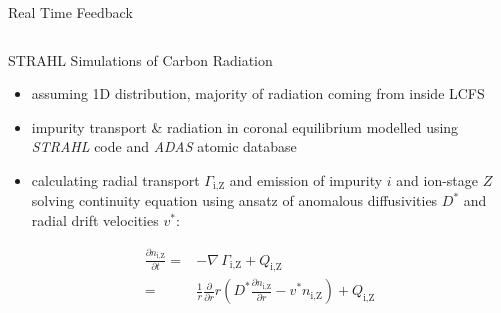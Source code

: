 \documentclass[final]{beamer}
\newcommand{\ix}[1]{_\text{#1}}
\newcommand{\fett}[1]{\textbf{#1}}
\newcommand{\tilt}[1]{\textit{#1}}
\begin{document}
\begin{frame}
\begin{minipage}[t]{0.6\textwidth}
\begin{kasten}{Real Time Feedback}
\begin{columns}
\begin{kasten4}{%
                        STRAHL Simulations of Carbon Radiation}
                        \flushleft{\normalsize{\color{ipp}\fett{\underline{%
                            STRAHL:}}}}\\%
                        \vspace*{.25cm}%
                        \small{\begin{itemize}%
                            \item{%
                                assuming 1D distribution, majority of %
                                radiation coming from inside LCFS}%
                            \item{%
                                impurity transport \& radiation in %
                                coronal equilibrium modelled using %
                                \tilt{STRAHL} code and \tilt{ADAS} %
                                atomic database}%
                            \item{%
                                calculating radial transport $\Gamma\ix{i,Z}$ %
                                and emission of impurity $i$ and ion-stage %
                                $Z$ solving continuity equation %
                                using ansatz of anomalous diffusivities %
                                $D^{*}$ and radial drift velocities $v^{*}$:}%
                        \end{itemize}}
                        \begin{align}%
                            \frac{\partial n\ix{i,Z}}{\partial t}=%
                                &-\nabla\,\Gamma\ix{i,Z}+Q\ix{i,Z}\nonumber\\%
                                =&\frac{1}{r}\frac{\partial}{\partial r}r\left(%
                                D^{*}\frac{\partial n\ix{i,Z}}{\partial r}-%
                                v^{*}n\ix{i,Z}\right)+Q\ix{i,Z}\nonumber%
                        \end{align}
                        \vspace*{.25cm}%


\end{kasten4}
\end{columns}
\end{kasten}
\end{minipage}
\end{frame}
\end{document}
